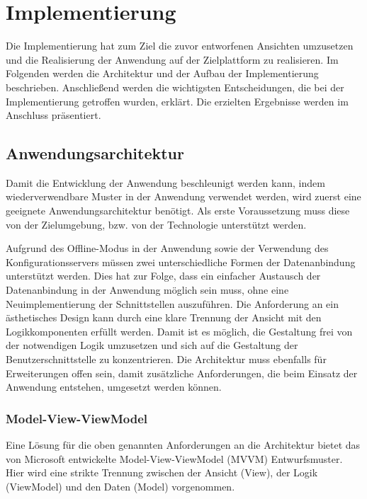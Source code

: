 \chapter{Implementierung}\label{chapter_5}
 Die Implementierung hat zum Ziel die zuvor entworfenen Ansichten umzusetzen und die Realisierung der Anwendung auf der Zielplattform zu realisieren. Im Folgenden werden die Architektur und der Aufbau der Implementierung beschrieben. Anschließend werden die wichtigsten Entscheidungen, die bei der Implementierung getroffen wurden, erklärt. Die erzielten Ergebnisse werden im Anschluss präsentiert. 

\section{Anwendungsarchitektur}
Damit die Entwicklung der Anwendung beschleunigt werden kann, indem wiederverwendbare Muster in der Anwendung verwendet werden, wird zuerst eine geeignete Anwendungsarchitektur benötigt. Als erste Voraussetzung muss diese von der Zielumgebung, bzw. von der Technologie unterstützt werden. \par 

Aufgrund des Offline-Modus in der Anwendung sowie der Verwendung des Konfigurationsservers müssen zwei unterschiedliche Formen der Datenanbindung unterstützt werden. Dies hat zur Folge, dass ein einfacher Austausch der Datenanbindung in der Anwendung möglich sein muss, ohne eine Neuimplementierung der Schnittstellen auszuführen. Die Anforderung an ein ästhetisches Design kann durch eine klare Trennung der Ansicht mit den Logikkomponenten erfüllt werden. Damit ist es möglich, die Gestaltung frei von der notwendigen Logik umzusetzen und sich auf die Gestaltung der Benutzerschnittstelle zu konzentrieren. Die Architektur muss ebenfalls für Erweiterungen offen sein, damit zusätzliche Anforderungen, die beim Einsatz der Anwendung entstehen, umgesetzt werden können.

\subsection{Model-View-ViewModel}
Eine Lösung für die oben genannten Anforderungen an die Architektur bietet das von Microsoft entwickelte Model-View-ViewModel (MVVM) Entwurfsmuster. Hier wird eine strikte Trennung zwischen der Ansicht (View), der Logik (ViewModel) und den Daten (Model) vorgenommen.\par 

